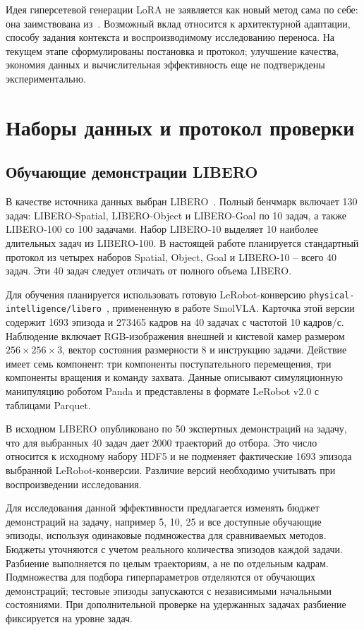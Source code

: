 \documentclass{misisarticle}
\begin{document}
Идея гиперсетевой генерации LoRA не заявляется как новый метод сама по себе: она заимствована из~\cite{hyperlora}. Возможный вклад относится к архитектурной адаптации, способу задания контекста и воспроизводимому исследованию переноса. На текущем этапе сформулированы постановка и протокол; улучшение качества, экономия данных и вычислительная эффективность еще не подтверждены экспериментально.

\section{Наборы данных и протокол проверки}

\subsection{Обучающие демонстрации LIBERO}

В качестве источника данных выбран LIBERO~\cite{libero}. Полный бенчмарк включает 130 задач: LIBERO-Spatial, LIBERO-Object и LIBERO-Goal по 10 задач, а также LIBERO-100 со 100 задачами. Набор LIBERO-10 выделяет 10 наиболее длительных задач из LIBERO-100. В настоящей работе планируется стандартный протокол из четырех наборов Spatial, Object, Goal и LIBERO-10 -- всего 40 задач. Эти 40 задач следует отличать от полного объема LIBERO.

Для обучения планируется использовать готовую LeRobot-конверсию \texttt{physical-intelligence/libero}~\cite{liberodata}, примененную в работе SmolVLA. Карточка этой версии содержит 1693 эпизода и 273465 кадров на 40 задачах с частотой 10 кадров/с. Наблюдение включает RGB-изображения внешней и кистевой камер размером $256\times256\times3$, вектор состояния размерности 8 и инструкцию задачи. Действие имеет семь компонент: три компоненты поступательного перемещения, три компоненты вращения и команду захвата. Данные описывают симуляционную манипуляцию роботом Panda и представлены в формате LeRobot v2.0 с таблицами Parquet.

В исходном LIBERO опубликовано по 50 экспертных демонстраций на задачу, что для выбранных 40 задач дает 2000 траекторий до отбора. Это число относится к исходному набору HDF5 и не подменяет фактические 1693 эпизода выбранной LeRobot-конверсии. Различие версий необходимо учитывать при воспроизведении исследования.

Для исследования данной эффективности предлагается изменять бюджет демонстраций на задачу, например 5, 10, 25 и все доступные обучающие эпизоды, используя одинаковые подмножества для сравниваемых методов. Бюджеты уточняются с учетом реального количества эпизодов каждой задачи. Разбиение выполняется по целым траекториям, а не по отдельным кадрам. Подмножества для подбора гиперпараметров отделяются от обучающих демонстраций; тестовые эпизоды запускаются с независимыми начальными состояниями. При дополнительной проверке на удержанных задачах разбиение фиксируется на уровне задач.
\end{document}
